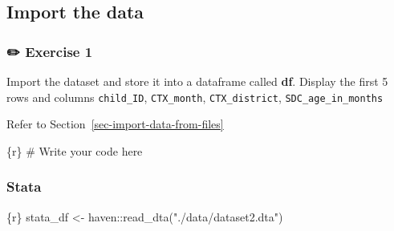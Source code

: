\documentclass[
  letterpaper,
  DIV=11,
  numbers=noendperiod,
  oneside]{scrreprt}
\newenvironment{Shaded}{\begin{snugshade}}{\end{snugshade}}
\newcommand{\CommentTok}[1]{\textcolor[rgb]{0.37,0.37,0.37}{#1}}
\newcommand{\FunctionTok}[1]{\textcolor[rgb]{0.28,0.35,0.67}{#1}}
\newcommand{\InformationTok}[1]{\textcolor[rgb]{0.37,0.37,0.37}{#1}}
\newcommand{\NormalTok}[1]{\textcolor[rgb]{0.00,0.23,0.31}{#1}}
\newcommand{\OtherTok}[1]{\textcolor[rgb]{0.00,0.23,0.31}{#1}}
\newcommand{\SpecialCharTok}[1]{\textcolor[rgb]{0.37,0.37,0.37}{#1}}
\newcommand{\StringTok}[1]{\textcolor[rgb]{0.13,0.47,0.30}{#1}}
\begin{document}
\hypertarget{import-the-data}{%
\subsection{Import the data}\label{import-the-data}}

\hypertarget{exercise-1-4}{%
\subsubsection{\texorpdfstring{{✏️} Exercise
1}{✏️ Exercise 1}}\label{exercise-1-4}}

Import the dataset and store it into a dataframe called \textbf{df}.
Display the first 5 rows and columns \texttt{child\_ID},
\texttt{CTX\_month}, \texttt{CTX\_district},
\texttt{SDC\_age\_in\_months}

\begin{tcolorbox}[enhanced jigsaw, colbacktitle=quarto-callout-tip-color!10!white, titlerule=0mm, breakable, opacityback=0, opacitybacktitle=0.6, left=2mm, coltitle=black, colback=white, title=\textcolor{quarto-callout-tip-color}{\faLightbulb}\hspace{0.5em}{Tip}, rightrule=.15mm, colframe=quarto-callout-tip-color-frame, toprule=.15mm, bottomtitle=1mm, toptitle=1mm, arc=.35mm, bottomrule=.15mm, leftrule=.75mm]
Refer to Section~\ref{sec-import-data-from-files}
\end{tcolorbox}

\begin{Shaded}
\begin{Highlighting}[]
\InformationTok{\textasciigrave{}\textasciigrave{}\textasciigrave{}\{r\}}
\CommentTok{\# Write your code here}
\InformationTok{\textasciigrave{}\textasciigrave{}\textasciigrave{}}
\end{Highlighting}
\end{Shaded}

\hypertarget{stata-4}{%
\subsubsection{Stata}\label{stata-4}}

\begin{Shaded}
\begin{Highlighting}[]
\InformationTok{\textasciigrave{}\textasciigrave{}\textasciigrave{}\{r\}}
\NormalTok{stata\_df }\OtherTok{\textless{}{-}}\NormalTok{ haven}\SpecialCharTok{::}\FunctionTok{read\_dta}\NormalTok{(}\StringTok{"./data/dataset2.dta"}\NormalTok{)}
\InformationTok{\textasciigrave{}\textasciigrave{}\textasciigrave{}}
\end{Highlighting}
\end{Shaded}
\end{document}
